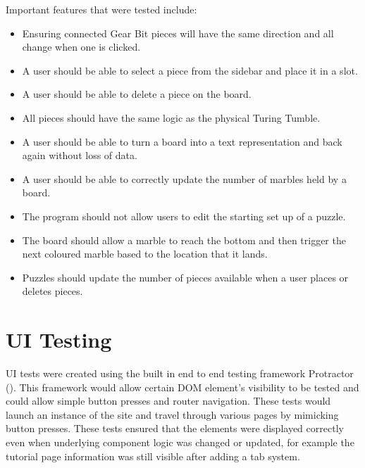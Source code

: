 \documentclass{l4proj}
\begin{document}
Important features that were tested include:
\begin{itemize}
    \item Ensuring connected Gear Bit pieces will have the same direction and all change when one is clicked.
    \item A user should be able to select a piece from the sidebar and place it in a slot.
    \item A user should be able to delete a piece on the board.
    \item All pieces should have the same logic as the physical Turing Tumble.
    \item A user should be able to turn a board into a text representation and back again without loss of data.
    \item A user should be able to correctly update the number of marbles held by a board.
    \item The program should not allow users to edit the starting set up of a puzzle.
    \item The board should allow a marble to reach the bottom and then trigger the next coloured marble based to the location that it lands.
    \item Puzzles should update the number of pieces available when a user places or deletes pieces.
\end{itemize}

\section{UI Testing}
UI tests were created using the built in end to end testing framework Protractor (\cite{protractor}). This framework would allow certain DOM element's visibility to be tested and could allow simple button presses and router navigation. These tests would launch an instance of the site and travel through various pages by mimicking button presses. These tests ensured that the elements were displayed correctly even when underlying component logic was changed or updated, for example the tutorial page information was still visible after adding a tab system. 
\end{document}
